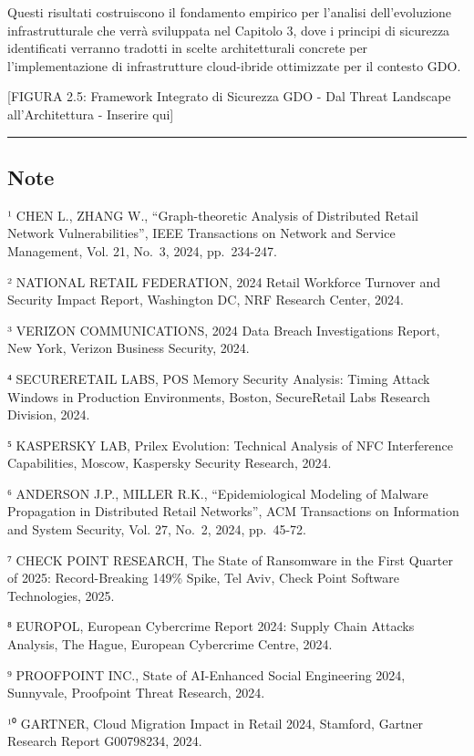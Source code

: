 \documentclass{report}
\begin{document}
Questi risultati costruiscono il fondamento empirico per l'analisi
dell'evoluzione infrastrutturale che verrà sviluppata nel Capitolo 3,
dove i principi di sicurezza identificati verranno tradotti in scelte
architetturali concrete per l'implementazione di infrastrutture
cloud-ibride ottimizzate per il contesto GDO.

{[}FIGURA 2.5: Framework Integrato di Sicurezza GDO - Dal Threat
Landscape all'Architettura - Inserire qui{]}

\begin{center}\rule{0.5\linewidth}{0.5pt}\end{center}

\subsection{Note}\label{note-1}

¹ CHEN L., ZHANG W., ``Graph-theoretic Analysis of Distributed Retail
Network Vulnerabilities'', IEEE Transactions on Network and Service
Management, Vol. 21, No.~3, 2024, pp.~234-247.

² NATIONAL RETAIL FEDERATION, 2024 Retail Workforce Turnover and
Security Impact Report, Washington DC, NRF Research Center, 2024.

³ VERIZON COMMUNICATIONS, 2024 Data Breach Investigations Report, New
York, Verizon Business Security, 2024.

⁴ SECURERETAIL LABS, POS Memory Security Analysis: Timing Attack Windows
in Production Environments, Boston, SecureRetail Labs Research Division,
2024.

⁵ KASPERSKY LAB, Prilex Evolution: Technical Analysis of NFC
Interference Capabilities, Moscow, Kaspersky Security Research, 2024.

⁶ ANDERSON J.P., MILLER R.K., ``Epidemiological Modeling of Malware
Propagation in Distributed Retail Networks'', ACM Transactions on
Information and System Security, Vol. 27, No.~2, 2024, pp.~45-72.

⁷ CHECK POINT RESEARCH, The State of Ransomware in the First Quarter of
2025: Record-Breaking 149\% Spike, Tel Aviv, Check Point Software
Technologies, 2025.

⁸ EUROPOL, European Cybercrime Report 2024: Supply Chain Attacks
Analysis, The Hague, European Cybercrime Centre, 2024.

⁹ PROOFPOINT INC., State of AI-Enhanced Social Engineering 2024,
Sunnyvale, Proofpoint Threat Research, 2024.

¹⁰ GARTNER, Cloud Migration Impact in Retail 2024, Stamford, Gartner
Research Report G00798234, 2024.
\end{document}
